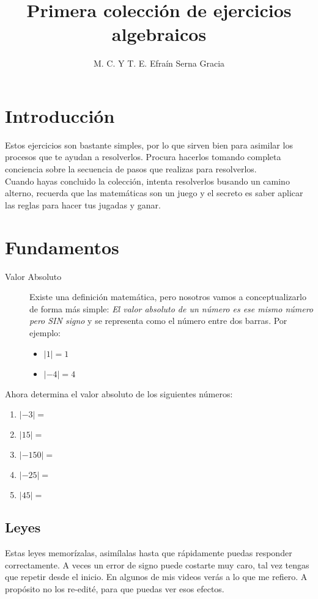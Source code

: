 \documentclass[11pt,twocolumn]{article} %
\title{Primera colección de ejercicios algebraicos}
\author{M. C. Y T. E. Efraín Serna Gracia}
\begin{document}
\maketitle
\tableofcontents
\section*{Introducción}
Estos ejercicios son bastante simples, por lo que sirven bien para asimilar los procesos que te ayudan a resolverlos. Procura hacerlos tomando completa conciencia sobre la secuencia de pasos que realizas para resolverlos.\\

Cuando hayas concluido la colección, intenta resolverlos busando un camino alterno, recuerda que las matemáticas son un juego y el secreto es saber aplicar las reglas para hacer tus jugadas y ganar. 

\section{Fundamentos}
\begin{description}
\item[Valor Absoluto] Existe una definición matemática, pero nosotros vamos a conceptualizarlo de forma más simple: \emph{El valor absoluto de un número es ese mismo número pero SIN signo} y se representa como el número entre dos barras. Por ejemplo:
\begin{itemize}
\item $|1| = 1$
\item $|-4| = 4$
\end{itemize}
\end{description}
Ahora determina el valor absoluto de los siguientes números:
\begin{enumerate}
\item $|-3|=$
\item $|15|=$
\item $|-150|=$
\item $|-25|=$
\item $|45|=$
\end{enumerate}

\subsection{Leyes}
Estas leyes memorízalas, asimílalas hasta que rápidamente puedas responder correctamente. A veces un error de signo puede costarte muy caro, tal vez tengas que repetir desde el inicio. En algunos de mis videos verás a lo que me refiero. A propósito no los re-edité, para que puedas ver esos efectos.
\end{document}
